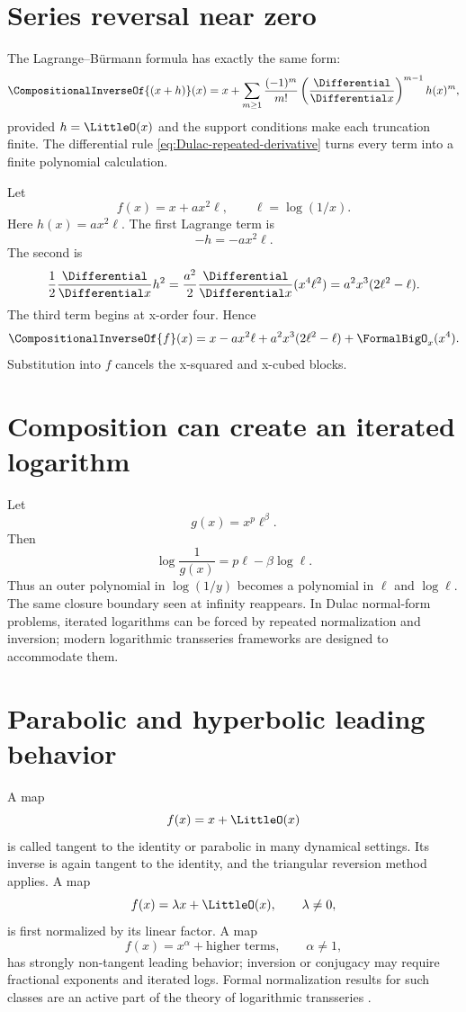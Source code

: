 \documentclass[11pt,openany]{book}
\theoremstyle{definition}
\theoremstyle{plain}
\theoremstyle{remark}
\newcommand{\rev}[1]{\CompositionalInverseOf{#1}}
\begin{document}
\section{Series reversal near zero}
The Lagrange--Bürmann formula has exactly the same form:
\begin{equation}\label{eq:small-Lagrange}
 \rev{(x+h)}(x)
 =x+\sum_{m\ge1}\frac{(-1)^m}{m!}
 \left(\frac{\Differential}{\Differential x}\right)^{m-1}h(x)^m,
\end{equation}
provided \(h=\LittleO(x)\) and the support conditions make each truncation finite.
The differential rule \cref{eq:Dulac-repeated-derivative} turns every term into
a finite polynomial calculation.

\begin{workedbox}[title={Reversing \(x+a x^2\log(1/x)\)}]
Let
\[
 f(x)=x+a x^2\ell,
 \qquad \ell=\log(1/x).
\]
Here \(h(x)=a x^2\ell\).  The first Lagrange term is
\[
 -h=-a x^2\ell.
\]
The second is
\[
 \frac12\frac{\Differential}{\Differential x}h^2
 =\frac{a^2}{2}\frac{\Differential}{\Differential x}(x^4\ell^2)
 =a^2x^3(2\ell^2-\ell).
\]
The third term begins at x-order four.  Hence
\begin{equation}\label{eq:small-inverse-example}
 \rev f(x)=x-a x^2\ell+a^2x^3(2\ell^2-\ell)
 +\FormalBigO_x(x^4).
\end{equation}
Substitution into \(f\) cancels the x-squared and x-cubed blocks.
\end{workedbox}

\section{Composition can create an iterated logarithm}
Let
\[
 g(x)=x^p\ell^\beta.
\]
Then
\begin{equation}\label{eq:small-nested-log}
 \log\frac1{g(x)}
 =p\ell-\beta\log\ell.
\end{equation}
Thus an outer polynomial in \(\log(1/y)\) becomes a polynomial in \(\ell\) and
\(\log\ell\).  The same closure boundary seen at infinity reappears.  In Dulac
normal-form problems, iterated logarithms can be forced by repeated
normalization and inversion; modern logarithmic transseries frameworks are
designed to accommodate them.

\section{Parabolic and hyperbolic leading behavior}
A map
\[
 f(x)=x+\LittleO(x)
\]
is called tangent to the identity or parabolic in many dynamical settings.  Its
inverse is again tangent to the identity, and the triangular reversion method
applies.  A map
\[
 f(x)=\lambda x+\LittleO(x),
 \qquad \lambda\ne0,
\]
is first normalized by its linear factor.  A map
\[
 f(x)=x^\alpha+\text{higher terms},
 \qquad \alpha\ne1,
\]
has strongly non-tangent leading behavior; inversion or conjugacy may require
fractional exponents and iterated logs.  Formal normalization results for such
classes are an active part of the theory of logarithmic transseries
\cite{mardesic-powerlog,peran-logarithmic}.
\end{document}
